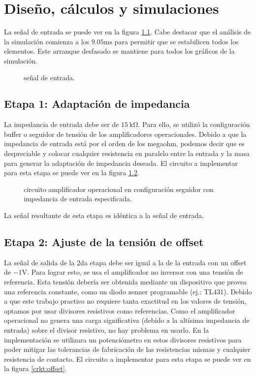 \chapter{Diseño, cálculos y simulaciones}
\label{chap:diseno-calculos}
La señal de entrada se puede ver en la figura \ref{plot:vi}. Cabe destacar que el análisis de la simulación comienza a
los $9.05 \si{\milli\second}$ para permitir que se estabilicen todos los elementos. Este arranque desfasado se mantiene
para todos los gráficos de la simulación.

\begin{figure}[!ht]
  \centering
  
  \caption{señal de entrada.}
  \label{plot:vi}
\end{figure}

\section{Etapa 1: Adaptación de impedancia}
La impedancia de entrada debe ser de $\SI{15}{\kilo\ohm}$. Para ello, se utilizó la configuración buffer o seguidor de
tensión de los amplificadores operacionales. Debido a que la impedancia de entrada está por el orden de los megaohm,
podemos decir que es despreciable y colocar cualquier resistencia en paralelo entre la entrada y la masa para generar la
adaptación de impedancia deseada. El circuito a implementar para esta etapa se puede ver en la figura
\ref{crkt:adaptacion.impedancia}.

\begin{figure}[!ht]
  \centering
  
  \caption{circuito amplificador operacional en configuración seguidor con impedancia de entrada especificada.}
  \label{crkt:adaptacion.impedancia}
\end{figure}

La señal resultante de esta etapa es idéntica a la señal de entrada.

\section{Etapa 2: Ajuste de la tensión de offset}
La señal de salida de la 2da etapa debe ser igual a la de la entrada con un offset de $-1 \si{\volt}$. Para lograr
esto, se usa el amplificador no inversor con una tensión de referencia. Esta tensión debería ser obtenida mediante un
dispositivo que provea una referencia constante, como un diodo zenner programable (ej.: TL431). Debido a que este
trabajo practico no requiere tanta exactitud en los valores de tensión, optamos por usar divisores resistivos como
referencias. Como el amplificador operacional no genera una carga significativa (debido a la altísima impedancia de
entrada) sobre el divisor resistivo, no hay problema en usarlo. En la implementación se utilizara un
potenciómetro en estos divisores resistivos para poder mitigar las tolerancias de fabricación de las resistencias mismas
y cualquier resistencia de contacto. El circuito a implementar para esta etapa se puede ver en la figura
\ref{crkt:offset}.

